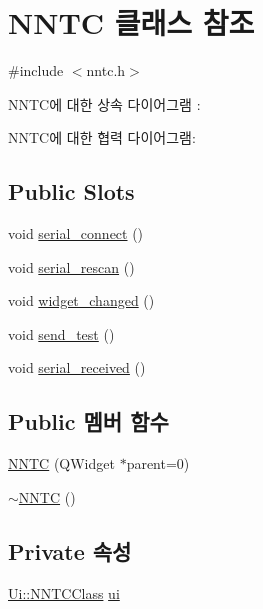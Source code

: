 \hypertarget{class_n_n_t_c}{}\section{N\+N\+TC 클래스 참조}
\label{class_n_n_t_c}


{\ttfamily \#include $<$nntc.\+h$>$}



N\+N\+T\+C에 대한 상속 다이어그램 \+: 


N\+N\+T\+C에 대한 협력 다이어그램\+:
\subsection*{Public Slots}
\begin{DoxyCompactItemize}
\item 
void \mbox{\hyperlink{class_n_n_t_c_ae9613ae3c1668e30610e0104e8e53d40}{serial\+\_\+connect}} ()
\item 
void \mbox{\hyperlink{class_n_n_t_c_a5c1cdbe97b81d19b31ff07e9ca413be2}{serial\+\_\+rescan}} ()
\item 
void \mbox{\hyperlink{class_n_n_t_c_ac33ec4d5e113accf260bc4b4d9f77338}{widget\+\_\+changed}} ()
\item 
void \mbox{\hyperlink{class_n_n_t_c_a7734a6d097beaf07c27e46af0987d59a}{send\+\_\+test}} ()
\item 
void \mbox{\hyperlink{class_n_n_t_c_a2064774e2931ebb77e62bbd5115c0589}{serial\+\_\+received}} ()
\end{DoxyCompactItemize}
\subsection*{Public 멤버 함수}
\begin{DoxyCompactItemize}
\item 
\mbox{\hyperlink{class_n_n_t_c_a6b610d14cbd1da9f70d6aafb8f8f630a}{N\+N\+TC}} (Q\+Widget $\ast$parent=0)
\item 
\mbox{\hyperlink{class_n_n_t_c_a36e06f71df0bfcbeb932f34c5986801a}{$\sim$\+N\+N\+TC}} ()
\end{DoxyCompactItemize}
\subsection*{Private 속성}
\begin{DoxyCompactItemize}
\item 
\mbox{\hyperlink{class_ui_1_1_n_n_t_c_class}{Ui\+::\+N\+N\+T\+C\+Class}} \mbox{\hyperlink{class_n_n_t_c_aafbe297818dd00b2c0f791ebb06292a4}{ui}}
\end{DoxyCompactItemize}


